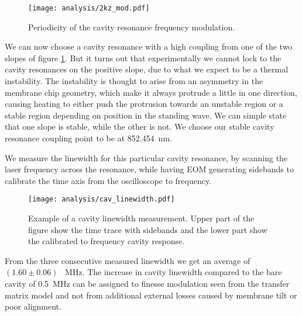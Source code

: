 \begin{figure}[H]
\centering
\texttt{[image: analysis/2kz\_mod.pdf]}
\caption{Periodicity of the cavity resonance frequency modulation.}
\label{fig:2kz}
\end{figure}

We can now choose a cavity resonance with a high coupling from one of the two slopes of figure \ref{fig:2kz}. But it turns out that experimentally we cannot lock to the cavity resonances on the positive slope, due to what we expect to be a thermal instability. The instability is thought to arise from an asymmetry in the membrane chip geometry, which make it always protrude a little in one direction, causing heating to either push the protrusion towards an unstable region or a stable region depending on position in the standing wave. We can simple state that one slope is stable, while the other is not. We choose our stable cavity resonance coupling point to be at \SI{852.454}{\nano\meter}.

We measure the linewidth for this particular cavity resonance, by scanning the laser frequency across the resonance, while having EOM generating sidebands to calibrate the time axis from the oscilloscope to frequency.

\begin{figure}[H]
\centering
\texttt{[image: analysis/cav\_linewidth.pdf]}
\caption{Example of a cavity linewidth measurement. Upper part of the figure show the time trace with sidebands and the lower part show the calibrated to frequency cavity response.}
\label{fig:2kz_cav_lw}
\end{figure}
\noindent
From the three consecutive measured linewidth we get an average of $(1.60 \pm 0.06)$ \SI{}{\mega\hertz}. The increase in cavity linewidth compared to the bare cavity of \SI{0.5}{\mega\hertz} can be assigned to finesse modulation seen from the transfer matrix model \cite{Wilson2011} and not from additional external losses caused by membrane tilt or poor alignment.